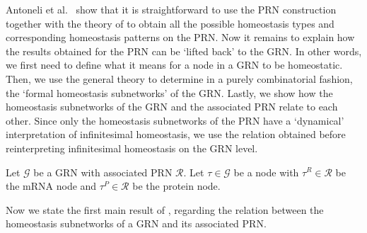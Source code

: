 \documentclass[a4paper,fleqn]{cas-dc}
\newcommand{\END}{\hfill\mbox{\raggedright \mbox{\raisebox{2pt}{\scalebox{0.6}{$\Diamond$}}}}\medskip}
\newcommand{\etal}{\textrm{et al.}}
\begin{document}
Antoneli \etal~\cite{antoneli2023} show that it is straightforward to use the PRN construction together with the theory of \cite{wang2021} to obtain all the possible homeostasis types and corresponding homeostasis patterns on the PRN.
Now it remains to explain how the results obtained for the PRN can be `lifted back' to the GRN.
In other words, we first need to define what it means for a node in a GRN to be homeostatic.
Then, we use the general theory to determine in a purely combinatorial fashion, the `formal homeostasis subnetworks' of the GRN.
Lastly, we show how the homeostasis subnetworks of the GRN and the associated PRN relate to each other.
Since only the homeostasis subnetworks of the PRN have a `dynamical' interpretation of infinitesimal homeostasis, we use the relation obtained before reinterpreting infinitesimal homeostasis on the GRN level.

\begin{definition} \normalfont
\label{def:special_component}
Let $\mathcal{G}$ be a GRN with associated PRN $\mathcal{R}$.
Let $\tau\in\mathcal{G}$ be a node with
$\tau^R\in\mathcal{R}$ be the mRNA node and $\tau^P\in\mathcal{R}$ be the protein node.
\end{definition}

Now we state the first main result of \cite{antoneli2023}, regarding the relation between the homeostasis subnetworks of a GRN and its associated PRN.
\end{document}
